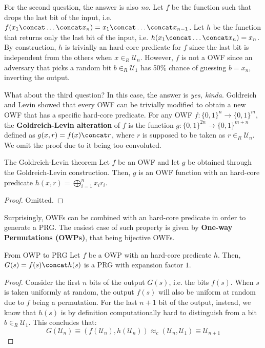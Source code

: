 \documentclass[a4paper, 12pt]{report}
\begin{document}
    For the second question, the answer is also \textit{no}. Let $f$ be the function such that drops the last bit of the input, i.e. $f(x_1 \concat \ldots \concat x_n) = x_1 \concat \ldots \concat x_{n-1}$. Let $h$ be the function that returns only the last bit of the input, i.e. $h(x_1 \concat \ldots \concat x_n) = x_n$. By construction, $h$ is trivially an hard-core predicate for $f$ since the last bit is independent from the others when $x \in_R \mathcal{U}_n$. However, $f$ is not a OWF since an adversary that picks a random bit $b \in_R \mathcal{U}_1$ has 50\% chance of guessing $b = x_n$, inverting the output.

    What about the third question? In this case, the answer is \textit{yes, kinda}. Goldreich and Levin showed that every OWF can be trivially modified to obtain a new OWF that has a specific hard-core predicate. For any OWF $f : \{0,1\}^n \to \{0,1\}^m$, the \textbf{Goldreich-Levin alteration} of $f$ is the function $g : \{0,1\}^{2n} \to \{0,1\}^{m+n}$ defined as $g(x,r) = f(x) \concat r$, where $r$ is supposed to be taken as $r \in_R \mathcal{U}_n$. We omit the proof due to it being too convoluted.

    \begin{framedthm}{The Goldreich-Levin theorem}
        Let $f$ be an OWF and let $g$ be obtained through the Goldreich-Levin construction. Then, $g$ is an OWF function with an hard-core predicate $h(x,r) = \bigoplus_{i = 1}^n x_i r_i$.
    \end{framedthm}

    \begin{proof}
        Omitted.
    \end{proof}

    Surprisingly, OWFs can be combined with an hard-core predicate in order to generate a PRG. The easiest case of such property is given by \textbf{One-way Permutations (OWPs)}, that being bijective OWFs.
    
    \begin{framedprop}{From OWP to PRG}
        Let $f$ be a OWP with an hard-core predicate $h$. Then, $G(s) = f(s) \concat h(s)$ is a PRG with expansion factor $1$.
    \end{framedprop}

    \begin{proof}
        Consider the first $n$ bits of the output $G(s)$, i.e. the bits $f(s)$. When $s$ is taken uniformly at random, the output $f(s)$ will also be uniform at random due to $f$ being a permutation. For the last $n+1$ bit of the output, instead, we know that $h(s)$ is by definition computationally hard to distinguish from a bit $b \in_R \mathcal{U}_1$. This concludes that:
        \[G(\mathcal{U}_n) \equiv (f(\mathcal{U}_n), h(\mathcal{U}_n)) \approx_c (\mathcal{U}_n, \mathcal{U}_1) \equiv \mathcal{U}_{n+1} \]
    \end{proof}
\end{document}
